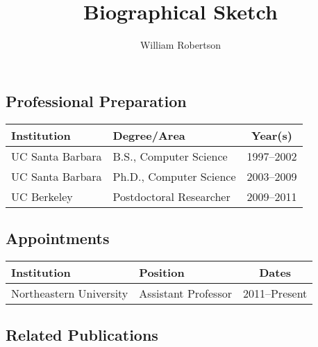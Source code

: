 \documentclass[letterpaper,11pt]{scrartcl}
\begin{document}
\title{Biographical Sketch}
\subtitle{William Robertson}
\author{}
\date{}
\maketitle

\subsection*{Professional Preparation}

\begin{tabularx}{\textwidth}{XXc}
\toprule
\sffamily\textbf{Institution} & \sffamily\textbf{Degree/Area} &
    \sffamily\textbf{Year(s)}\\
\midrule
UC Santa Barbara & B.S., Computer Science & 1997--2002\\
UC Santa Barbara & Ph.D., Computer Science & 2003--2009\\
UC Berkeley & Postdoctoral Researcher & 2009--2011\\
\bottomrule
\end{tabularx}

\subsection*{Appointments}

\begin{tabularx}{\textwidth}{XXc}
\toprule
\sffamily\textbf{Institution} & \sffamily\textbf{Position} &
    \sffamily\textbf{Dates}\\
\midrule
Northeastern University & Assistant Professor & 2011--Present\\
\bottomrule
\end{tabularx}

\subsection*{Related Publications}
\end{document}
